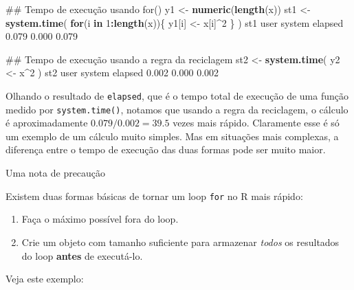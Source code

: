 \documentclass[10pt,a4paper]{book}
\newenvironment{Shaded}{\begin{snugshade}}{\end{snugshade}}
\newcommand{\KeywordTok}[1]{\textcolor[rgb]{0.13,0.29,0.53}{\textbf{#1}}}
\newcommand{\DecValTok}[1]{\textcolor[rgb]{0.00,0.00,0.81}{#1}}
\newcommand{\FloatTok}[1]{\textcolor[rgb]{0.00,0.00,0.81}{#1}}
\newcommand{\StringTok}[1]{\textcolor[rgb]{0.31,0.60,0.02}{#1}}
\newcommand{\ControlFlowTok}[1]{\textcolor[rgb]{0.13,0.29,0.53}{\textbf{#1}}}
\newcommand{\OperatorTok}[1]{\textcolor[rgb]{0.81,0.36,0.00}{\textbf{#1}}}
\newcommand{\NormalTok}[1]{#1}
\providecommand{\tightlist}{%
  \setlength{\itemsep}{0pt}\setlength{\parskip}{0pt}}
\begin{document}
\begin{Shaded}
\begin{Highlighting}[]
\NormalTok{## Tempo de execução usando for()}
\NormalTok{y1 <-}\StringTok{ }\KeywordTok{numeric}\NormalTok{(}\KeywordTok{length}\NormalTok{(x))}
\NormalTok{st1 <-}\StringTok{ }\KeywordTok{system.time}\NormalTok{(}
    \ControlFlowTok{for}\NormalTok{(i }\ControlFlowTok{in} \DecValTok{1}\OperatorTok{:}\KeywordTok{length}\NormalTok{(x))\{}
\NormalTok{        y1[i] <-}\StringTok{ }\NormalTok{x[i]}\OperatorTok{^}\DecValTok{2}
\NormalTok{    \}}
\NormalTok{)}
\NormalTok{st1}
\NormalTok{   user  system elapsed }
  \FloatTok{0.079}   \FloatTok{0.000}   \FloatTok{0.079} 

\NormalTok{## Tempo de execução usando a regra da reciclagem}
\NormalTok{st2 <-}\StringTok{ }\KeywordTok{system.time}\NormalTok{(}
\NormalTok{    y2 <-}\StringTok{ }\NormalTok{x}\OperatorTok{^}\DecValTok{2}
\NormalTok{)}
\NormalTok{st2}
\NormalTok{   user  system elapsed }
  \FloatTok{0.002}   \FloatTok{0.000}   \FloatTok{0.002} 
\end{Highlighting}
\end{Shaded}

Olhando o resultado de \texttt{elapsed}, que é o tempo total de execução
de uma função medido por \texttt{system.time()}, notamos que usando a
regra da reciclagem, o cálculo é aproximadamente \(0.079/0.002 = 39.5\)
vezes mais rápido. Claramente esse é só um exemplo de um cálculo muito
simples. Mas em situações mais complexas, a diferença entre o tempo de
execução das duas formas pode ser muito maior.

Uma nota de precaução

Existem duas formas básicas de tornar um loop \texttt{for} no R mais
rápido:

\begin{enumerate}
\def\labelenumi{\arabic{enumi}.}
\tightlist
\item
  Faça o máximo possível fora do loop.
\item
  Crie um objeto com tamanho suficiente para armazenar \emph{todos} os
  resultados do loop \textbf{antes} de executá-lo.
\end{enumerate}

Veja este exemplo:
\end{document}
